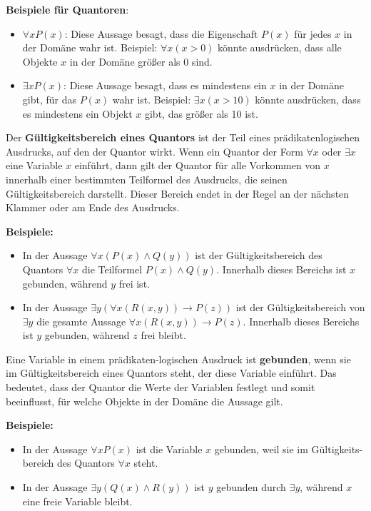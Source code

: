 \documentclass[main.tex]{subfiles}
\begin{document}
\textbf{Beispiele für Quantoren}:
\begin{itemize}
    \item \(\forall x P(x)\): Diese Aussage besagt, dass die Eigenschaft \(P(x)\) für jedes \(x\) in der Domäne wahr ist. Beispiel: \(\forall x (x > 0)\) könnte ausdrücken, dass alle Objekte \(x\) in der Domäne größer als 0 sind.
    \item \(\exists x P(x)\): Diese Aussage besagt, dass es mindestens ein \(x\) in der Domäne gibt, für das \(P(x)\) wahr ist. Beispiel: \(\exists x (x > 10)\) könnte ausdrücken, dass es mindestens ein Objekt \(x\) gibt, das größer als 10 ist.
\end{itemize}

\begin{definition}
Der \textbf{Gültigkeitsbereich eines Quantors} ist der Teil eines prädikatenlogischen Ausdrucks, auf den der Quantor wirkt. Wenn ein Quantor der Form \(\forall x\) oder \(\exists x\) eine Variable \(x\) einführt, dann gilt der Quantor für alle Vorkommen von \(x\) innerhalb einer bestimmten Teilformel des Ausdrucks, die seinen Gültigkeitsbereich darstellt. Dieser Bereich endet in der Regel an der nächsten Klammer oder am Ende des Ausdrucks.

\textbf{Beispiele:}
\begin{itemize}
    \item In der Aussage \(\forall x (P(x) \land Q(y))\) ist der Gültigkeitsbereich des Quantors \(\forall x\) die Teilformel \(P(x) \land Q(y)\). Innerhalb dieses Bereichs ist \(x\) gebunden, während \(y\) frei ist.
    \item In der Aussage \(\exists y (\forall x (R(x, y)) \rightarrow P(z))\) ist der Gültigkeitsbereich von \(\exists y\) die gesamte Aussage \(\forall x (R(x, y)) \rightarrow P(z)\). Innerhalb dieses Bereichs ist \(y\) gebunden, während \(z\) frei bleibt.
\end{itemize}
\end{definition}

\begin{definition}
Eine Variable in einem prädikaten-logischen Ausdruck ist \textbf{gebunden}, wenn sie im Gültigkeitsbereich eines Quantors steht, der diese Variable einführt. Das bedeutet, dass der Quantor die Werte der Variablen festlegt und somit beeinflusst, für welche Objekte in der Domäne die Aussage gilt.

\textbf{Beispiele:}
\begin{itemize}
    \item In der Aussage \(\forall x P(x)\) ist die Variable \(x\) gebunden, weil sie im Gültigkeits-bereich des Quantors \(\forall x\) steht.
    \item In der Aussage \(\exists y (Q(x) \land R(y))\) ist \(y\) gebunden durch \(\exists y\), während \(x\) eine freie Variable bleibt.
\end{itemize}
\end{definition}
\end{document}
